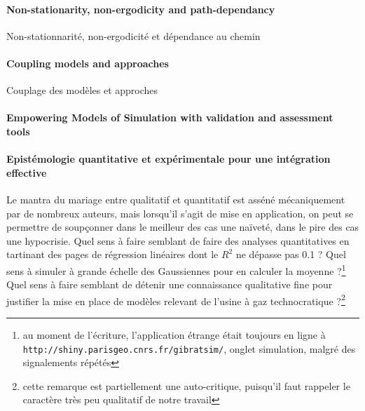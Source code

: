 \paragraph{Non-stationarity, non-ergodicity and path-dependancy}{Non-stationnarité, non-ergodicité et dépendance au chemin}




\paragraph{Coupling models and approaches}{Couplage des modèles et approches}






\paragraph{Empowering Models of Simulation with validation and assessment tools}






\paragraph{Epistémologie quantitative et expérimentale pour une intégration effective}

Le mantra du mariage entre qualitatif et quantitatif est asséné mécaniquement par de nombreux auteurs, mais lorsqu'il s'agit de mise en application, on peut se permettre de soupçonner dans le meilleur des cas une naïveté, dans le pire des cas une hypocrisie. Quel sens à faire semblant de faire des analyses quantitatives en tartinant des pages de régression linéaires dont le $R^2$ ne dépasse pas 0.1 ? %
 Quel sens à simuler à grande échelle des Gaussiennes pour en calculer la moyenne ?\footnote{au moment de l'écriture, l'application étrange était toujours en ligne à \texttt{http://shiny.parisgeo.cnrs.fr/gibratsim/}, onglet simulation, malgré des signalements répétés} Quel sens à faire semblant de détenir une connaissance qualitative fine pour justifier la mise en place de modèles relevant de l'usine à gaz technocratique ?\footnote{cette remarque est partiellement une auto-critique, puisqu'il faut rappeler le caractère très peu qualitatif de notre travail}


